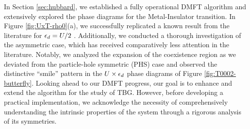 \documentclass[12pt]{report}
\begin{document}
In Section \ref{sec:hubbard}, we established a fully operational DMFT algorithm and extensively explored the phase diagrams for the Metal-Insulator transition. In Figure \ref{fig:UxT-rho0}(a), we successfully replicated a known result from the literature for $\epsilon_d = U/2$ \cite{georges1996}. Additionally, we conducted a thorough investigation of the asymmetric case, which has received comparatively less attention in the literature. Notably, we analyzed the expansion of the coexistence region as we deviated from the particle-hole symmetric (PHS) case and observed the distinctive ``smile'' pattern in the $U \times \epsilon_d$ phase diagrams of Figure \ref{fig:T0002-butterfly}. Looking ahead to our DMFT progress, our goal is to enhance and extend the algorithm for the study of TBG. However, before developing a practical implementation, we acknowledge the necessity of comprehensively understanding the intrinsic properties of the system through a rigorous analysis of its symmetries.

%




\end{document}
